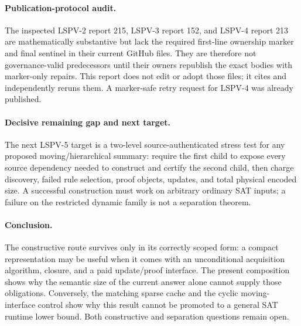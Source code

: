 \documentclass[11pt]{article}
\begin{document}
\paragraph{Publication-protocol audit.}
The inspected LSPV-2 report 215, LSPV-3 report 152, and LSPV-4 report 213 are mathematically substantive but lack the required first-line ownership marker and final sentinel in their current GitHub files.  They are therefore not governance-valid predecessors until their owners republish the exact bodies with marker-only repairs.  This report does not edit or adopt those files; it cites and independently reruns them.  A marker-safe retry request for LSPV-4 was already published.

\paragraph{Decisive remaining gap and next target.}
The next LSPV-5 target is a two-level source-authenticated stress test for any proposed moving/hierarchical summary: require the first child to expose every source dependency needed to construct and certify the second child, then charge discovery, failed rule selection, proof objects, updates, and total physical encoded size.  A successful construction must work on arbitrary ordinary SAT inputs; a failure on the restricted dynamic family is not a separation theorem.

\paragraph{Conclusion.}
The constructive route survives only in its correctly scoped form: a compact representation may be useful when it comes with an unconditional acquisition algorithm, closure, and a paid update/proof interface.  The present composition shows why the semantic size of the current answer alone cannot supply those obligations.  Conversely, the matching sparse cache and the cyclic moving-interface control show why this result cannot be promoted to a general SAT runtime lower bound.  Both constructive and separation questions remain open.

\end{document}
